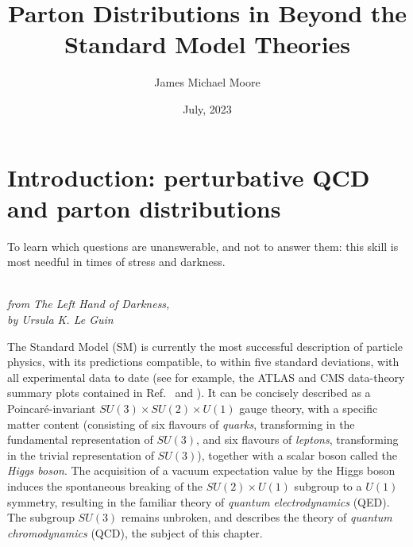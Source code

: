\documentclass[withindex,glossary]{cam-thesis}
\title{Parton Distributions in Beyond the Standard Model Theories}
\author{James Michael Moore}
\date{July, 2023}
\begin{document}
\frontmatter{}



\chapter{Introduction: perturbative QCD and parton distributions}
\label{chap:intro}

\epigraph{To learn which questions are unanswerable, and not to answer them: this skill is most needful in times of stress and darkness.}{\textit{\\ from The Left Hand of Darkness, \\ by Ursula K. Le Guin}}

The Standard Model (SM) is currently the most successful description of particle physics, with its predictions compatible, to within five standard deviations, with all experimental data to date (see for example, the ATLAS and CMS data-theory summary plots contained in Ref.~\cite{ATLAS:2022djm} and \cite{Ghosh:2019vqm}). It can be concisely described as a Poincar\'{e}-invariant $SU(3) \times SU(2) \times U(1)$ gauge theory, with a specific matter content (consisting of six flavours of \textit{quarks}, transforming in the fundamental representation of $SU(3)$, and six flavours of \textit{leptons}, transforming in the trivial representation of $SU(3)$), together with a scalar boson called the \textit{Higgs boson}. The acquisition of a vacuum expectation value by the Higgs boson induces the spontaneous breaking of the $SU(2) \times U(1)$ subgroup to a $U(1)$ symmetry, resulting in the familiar theory of \textit{quantum electrodynamics} (QED). The subgroup $SU(3)$ remains unbroken, and describes the theory of \textit{quantum chromodynamics} (QCD), the subject of this chapter.
\end{document}
